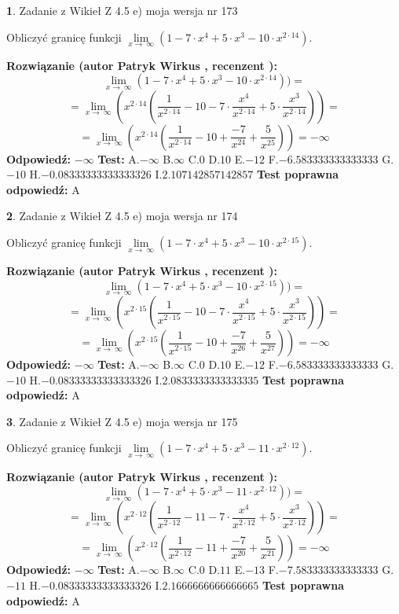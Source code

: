 \documentclass[12pt, a4paper]{article}
\theoremstyle{definition} %
\newtheorem{zad}{}
\newcommand{\zadStart}[1]{\begin{zad}#1\newline}
\newcommand{\zadStop}{\end{zad}}
\newcommand{\rozwStart}[2]{\noindent \textbf{Rozwiązanie (autor #1 , recenzent #2): }\newline}
\newcommand{\rozwStop}{\newline}
\newcommand{\odpStart}{\noindent \textbf{Odpowiedź:}\newline}
\newcommand{\odpStop}{\newline}
\newcommand{\testStart}{\noindent \textbf{Test:}\newline}
\newcommand{\testStop}{\newline}
\newcommand{\kluczStart}{\noindent \textbf{Test poprawna odpowiedź:}\newline}
\newcommand{\kluczStop}{\newline}
\begin{document}
\zadStart{Zadanie z Wikieł Z 4.5 e) moja wersja nr 173}


Obliczyć granicę funkcji  $\lim\limits_{x\to\ \infty}(1 - 7 \cdot x^{4}+5 \cdot x^{3}- 10 \cdot x^{2\cdot14})$.
\zadStop
\rozwStart{Patryk Wirkus}{}
$$\lim\limits_{x\to\ \infty}(1 - 7 \cdot x^{4}+5 \cdot x^{3}- 10 \cdot x^{2\cdot14}))=$$
$$=\lim\limits_{x\to\ \infty}(x^{2\cdot14}(\frac{1}{x^{2\cdot14}}-10 -7 \cdot \frac{x^{4}}{x^{2\cdot14}}+5 \cdot \frac{x^{3}}{x^{2\cdot14}}))=$$
$$=\lim\limits_{x\to\ \infty}(x^{2\cdot14}(\frac{1}{x^{2\cdot14}}-10 + \frac{-7}{x^{24}}+ \frac{5}{x^{25}}))=-\infty$$
\rozwStop
\odpStart
$-\infty$
\odpStop
\testStart
A.$-\infty$ B.$\infty$ C.$0$ D.$10$ E.$-12$
F.$-6.583333333333333$ G.$-10$
H.$-0.08333333333333326$
I.$2.107142857142857$
\testStop
\kluczStart
A
\kluczStop



\zadStart{Zadanie z Wikieł Z 4.5 e) moja wersja nr 174}


Obliczyć granicę funkcji  $\lim\limits_{x\to\ \infty}(1 - 7 \cdot x^{4}+5 \cdot x^{3}- 10 \cdot x^{2\cdot15})$.
\zadStop
\rozwStart{Patryk Wirkus}{}
$$\lim\limits_{x\to\ \infty}(1 - 7 \cdot x^{4}+5 \cdot x^{3}- 10 \cdot x^{2\cdot15}))=$$
$$=\lim\limits_{x\to\ \infty}(x^{2\cdot15}(\frac{1}{x^{2\cdot15}}-10 -7 \cdot \frac{x^{4}}{x^{2\cdot15}}+5 \cdot \frac{x^{3}}{x^{2\cdot15}}))=$$
$$=\lim\limits_{x\to\ \infty}(x^{2\cdot15}(\frac{1}{x^{2\cdot15}}-10 + \frac{-7}{x^{26}}+ \frac{5}{x^{27}}))=-\infty$$
\rozwStop
\odpStart
$-\infty$
\odpStop
\testStart
A.$-\infty$ B.$\infty$ C.$0$ D.$10$ E.$-12$
F.$-6.583333333333333$ G.$-10$
H.$-0.08333333333333326$
I.$2.0833333333333335$
\testStop
\kluczStart
A
\kluczStop



\zadStart{Zadanie z Wikieł Z 4.5 e) moja wersja nr 175}


Obliczyć granicę funkcji  $\lim\limits_{x\to\ \infty}(1 - 7 \cdot x^{4}+5 \cdot x^{3}- 11 \cdot x^{2\cdot12})$.
\zadStop
\rozwStart{Patryk Wirkus}{}
$$\lim\limits_{x\to\ \infty}(1 - 7 \cdot x^{4}+5 \cdot x^{3}- 11 \cdot x^{2\cdot12}))=$$
$$=\lim\limits_{x\to\ \infty}(x^{2\cdot12}(\frac{1}{x^{2\cdot12}}-11 -7 \cdot \frac{x^{4}}{x^{2\cdot12}}+5 \cdot \frac{x^{3}}{x^{2\cdot12}}))=$$
$$=\lim\limits_{x\to\ \infty}(x^{2\cdot12}(\frac{1}{x^{2\cdot12}}-11 + \frac{-7}{x^{20}}+ \frac{5}{x^{21}}))=-\infty$$
\rozwStop
\odpStart
$-\infty$
\odpStop
\testStart
A.$-\infty$ B.$\infty$ C.$0$ D.$11$ E.$-13$
F.$-7.583333333333333$ G.$-11$
H.$-0.08333333333333326$
I.$2.1666666666666665$
\testStop
\kluczStart
A
\kluczStop
\end{document}
